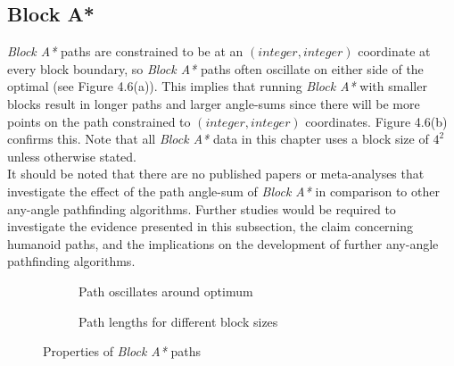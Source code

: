 \documentclass[12pt,notitlepage]{report}
\begin{document}
\subsection{Block A*}
{\em Block A*} paths are constrained to be at an $(integer,integer)$ coordinate at every block boundary, so {\em Block A*} paths often oscillate on either side of the optimal (see Figure 4.6(a)). This implies that running {\em Block A*} with smaller blocks result in longer paths and larger angle-sums since there will be more points on the path constrained to $(integer,integer)$ coordinates. Figure 4.6(b) confirms this. Note that all {\em Block A*} data in this chapter uses a block size of $4^{2}$ unless otherwise stated.\\

\noindent
It should be noted that there are no published papers or meta-analyses that investigate the effect of the path angle-sum of {\em Block A*} in comparison to other any-angle pathfinding algorithms. Further studies would be required to investigate the evidence presented in this subsection, the claim concerning humanoid paths, and the implications on the development of further any-angle pathfinding algorithms.

\begin{figure}
\centering
  \begin{subfigure}[b]{0.49\textwidth}
  \centering
  \caption{Path oscillates around optimum}
  \end{subfigure}
  \begin{subfigure}[b]{0.49\textwidth}
  \centering
  
  \caption{Path lengths for different block sizes}
  \end{subfigure}
\caption{Properties of {\em Block A*} paths}
\end{figure}
\end{document}
